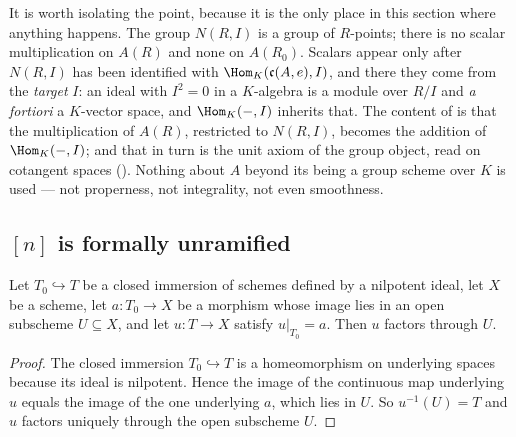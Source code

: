 \begin{remark}
\label{rem:av-kernel-source}
It is worth isolating the point, because it is the only place in this section
where anything happens.  The group $N(R,I)$ is a group of $R$-points; there is
no scalar multiplication on $A(R)$ and none on $A(R_0)$.  Scalars appear only
after $N(R,I)$ has been identified with
$\Hom_K(\mathfrak c(A,e),I)$, and there they come from the \emph{target} $I$:
an ideal with $I^2=0$ in a $K$-algebra is a module over $R/I$ and \emph{a
fortiori} a $K$-vector space, and $\Hom_K(-,I)$ inherits that.  The content of
 is that the multiplication of $A(R)$, restricted
to $N(R,I)$, becomes the addition of $\Hom_K(-,I)$; and that in turn is the
unit axiom of the group object, read on cotangent spaces
().  Nothing about $A$ beyond its being a
group scheme over $K$ is used --- not properness, not integrality, not even
smoothness.
\end{remark}

\subsection{$[n]$ is formally unramified}\label{sec:av-etale-unramified}

\begin{lemma}
\label{lem:av-lift-lands-in-open}
Let $T_0\hookrightarrow T$ be a closed immersion of schemes defined by a
nilpotent ideal, let $X$ be a scheme, let $a\colon T_0\to X$ be a morphism
whose image lies in an open subscheme $U\subseteq X$, and let $u\colon T\to X$
satisfy $u|_{T_0}=a$.  Then $u$ factors through $U$.
\end{lemma}
\begin{proof}
The closed immersion $T_0\hookrightarrow T$ is a homeomorphism on underlying
spaces because its ideal is nilpotent.  Hence the image of the continuous map
underlying $u$ equals the image of the one underlying $a$, which lies in $U$.
So $u^{-1}(U)=T$ and $u$ factors uniquely through the open subscheme $U$.
\end{proof}

